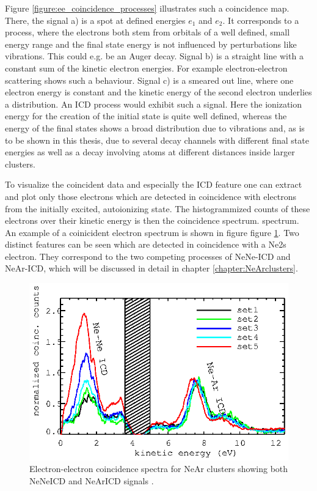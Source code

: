 Figure \ref{figure:ee_coincidence_processes} illustrates such a coincidence
map. There, the signal a) is a spot at defined energies $e_1$ and $e_2$.
It corresponds to a process, where the electrons both stem from orbitals
of a well defined, small energy range and the final state energy is not
influenced by perturbations like vibrations. This could e.g. be an Auger
decay.
Signal b) is a straight line with a constant sum of the kinetic electron
energies. For example electron-electron scattering shows such a behaviour.
Signal c) is a smeared out line, where one electron energy is constant
and the kinetic energy of the second electron underlies a distribution.
An ICD process would exhibit such a signal. Here the ionization energy
for the creation of the initial state is quite well defined, whereas
the energy of the final states shows a broad distribution due to
vibrations and, as is to be shown in this thesis, due to several decay
channels with different final state energies as well as a decay involving
atoms at different distances inside larger clusters.

To visualize the coincident data and especially the ICD feature one can
extract and plot only those electrons which are detected in coincidence with
electrons from the initially excited, autoionizing state.
The histogrammized counts of these electrons over their kinetic energy is
then the coincidence spectrum.
spectrum. An example  of a coinicident electron spectrum is shown in figure
figure \ref{figure:ICD_spectrum_example}. Two distinct features can be
seen which are detected in coincidence with a Ne2s electron. They correspond
to the two competing processes of NeNe-ICD and NeAr-ICD, which will be
discussed in detail in chapter \ref{chapter:NeArclusters}.


\begin{figure}[h]
  \centering
  \includegraphics{pics/exp_near_coinc_sets.eps}
  \caption{Electron-electron coincidence spectra for NeAr clusters
           showing both NeNeICD and NeArICD signals \cite{Fasshauer14_1}.}
  \label{figure:ICD_spectrum_example}
\end{figure}
